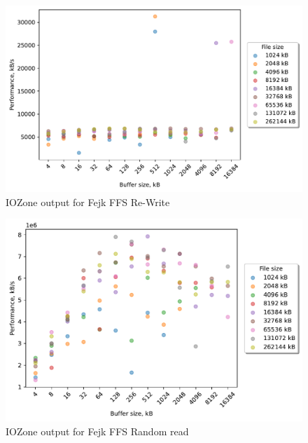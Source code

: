 \begin{figure}[!htb]
	\label{fig:bench_fffs_re_write}
	\begin{center}
		\includegraphics[width=1.0\textwidth]{figures/benchmarking/fejk-ffs/Re-Write.pdf}
	\end{center}
	\caption{IOZone output for Fejk FFS \mbox{Re-Write}}
\end{figure}

\begin{figure}[!htb]
	\label{fig:bench_fffs_rnd_read}
	\begin{center}
		\includegraphics[width=1.0\textwidth]{figures/benchmarking/fejk-ffs/Random read.pdf}
	\end{center}
	\caption{IOZone output for Fejk FFS Random read}
\end{figure}

